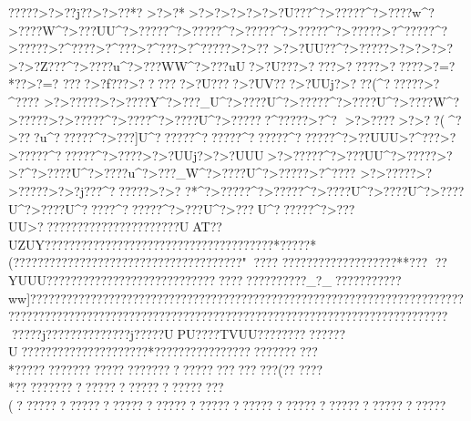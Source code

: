 {{{{{{{{{{{{{{{{{{{{{{{{{{{{{{{{{{{{{{{{{{{{{{{{{{{{{{{{{{{{{{{{{{{{{{{{{{{{{{{{{{{{{{{{{{{{{{{{{{{{{{{{{{{{{{{{{{{{{{{{{{{{{{{{{{{{{{{{{{{{{{{{{{{{{{{{{{{{{{{{{{{{{{{{{{{{{{{{{{{{{{{{{{{{{{{{{{{{{{{{{{{{{{{{{{{{{{{{{{{{{{{{{{{{{{{{{{{{{{{{{{{{{{{{{{{{{{{{{{{{{{{{{{{{{{{{{{{{{{{{{{{{{{{{{{{{{{{{{{{{{{{{{{{{{{{{{{{{{{{{{{{{{{{{{{{{{{{{{{{{{{{{{{{{{{{{{{{{{{{{{{{{{{{{{{{{{{{{{{{{{{{{{{{{{{{{{{{{{{{{{{{{{{{{{{{{{{{{{{{{{{{{{{{{{{{{{{{{{{{{{{{{{{{{{{{{{{{{{{{{{{{{{{{{{{{{{{{{{{{{{{{{{{{{{{{{{{{{{{{{{{{{{{{{{{{{{{{{{{{{{{{{{{{{{{{{{{{{{{{{{{{{{{{{{{{{{{{{{{{{{{{{{{{{{{{{{{{{{{{{{{{{{{{{{{{{{{{{{{{{{{{{{{{{{{{{{{{{{{{{{{{{{{{{{{{{{{{{{{{{{{{{{{{{{{{{{{{{{{{{{{{{{{{{{{{{{{{{{{{{{{{{{{{{{{{{{{{{{{{{{{{{{{{{{{{{{{{{{{{{{{{{{{{{{{{{{{{{{{{{{{{{{{{{{{{{{{{{{{{{{{{{{{{{{{{{{{{{{{{{{{{{{{{{{{{{{{{{{{{{{{{{{{{{{{{{{{{{{{{{{{{{{{{{{{{{{{{{{{{{{{{{{{{{{{{{{{{{{{{{{{{{{{{{{{{{{{{{{{{{{{{{{{{{{{{{{{{{{{{{{{{{{{{{{{{{{{{{{{{{{{{{{{{{{{{{{{{{{{{{{{{{{{{{{{{{{{{{{{{{{{{{{{{{{{{{{{{{{{{{{{{{{{{{{{{{{{{{{{{{{{{{{{{{{{{{{{{{{{{{{{{{{{{{{{{{{{{{{{{{{{{{{{{{{{{{{{{{{{{{{{{{{{{{{{{{{{{{{{{{{{{{{{{{{{{{{{{{{{{{{{{{{{{{{{{{{{{{{{{{{{{{{{{{{{{{{{{{{{{{{{{{{{{{{{{{{{{{{{{{{{{{{{{{{{{{{{{{{{{{{{{{{{{{{{{{{{{{{{{{{{{{{{{{{{{{{{{{{{{{{{{{{{{{{{{{{{{{{{{{{{{{{{{{{{{{{{{{{{{{{{{{{{{{{{{{{{{{{{{{{{{{{{{{{{{{{{{{{{{{{{{{{{{{{{{{{{{{{{{{{{{{{{{{{{{{{{{{{{{{{{{{{{{{{{{{{{{{{{{{{{{{{{{{{{{{{{{{{{{{{{{{{{{{{{{{{{{{{{{{{{{{{{{{{{{{{{{{{{{{{{{{{{{{{{{{{{{{{{{{{{{{{{{{{{{{{{{{{{{{{{{{{{{{{{{{{{{{{{{{{{{{{{{{{{{{{{{{{{{{{{{{{{{{{{{{{{{{{{{{{{{{{{{{{{{{{{{{{{{{{{{{{{{{{{{{{{{{{{{{{{{{{{{{{{{{{{{{{{{{{{{{{{{{{{{{{{{{{{{{{{{{{{{{{{{{{{{{{{{{{{{{{{{{{{{{{{{{{{{{{{{{{{{{{{{{{{{{{{{{{{{{{{{{{{{{{{{{{{{{{{{{{{{{{{{{{{{{{{{{{{{{{{{{{{{{{{{{{{{{{{{{{{{{{{{{{{{{{{{{{{{{{{{{{{{{{{{{{{{{{{{{{{{{{{{{{{{{{{{{{{{{{{{{{{{{{{{{{{{{{{{{{{{{{{{{{{{{{{{{{{{{{{{{{{{{{{{{{{{{{{{{{{{{{{{{{{?????>?>??j??>?>??*?
>?>?*  >?>?    >?>?    >?>?U???^?>?????^?>????w^?>????W^?>???UU^?>?????^?>?????^?>?????^?>?????^?>?????>?^?????^?>?????>?^???? >?^???>?^???>?^?????>?>??   >?>?UU??^?>?????>?>?    >?>?    >?>?Z???^?>????u^?>???WW^?>???uU?>?U???>??  ??>?? ???>?? ???>?=? *??>?=? ????>?f???>??????>?U????>?UV???>?UUj?>??  ?(^??????>?^???? >?>?????>?>????Y^?>???_U^?>????U^?>?????^?>????U^?>????W^?>?????>?>?????^?>????}^?>????U^?>??????^?????>?^?
  >?>????>?>??(^?>???u^??????^?>???]U^??????^??????^??????^??????^?>??UUU>?^???  >?>?????^??????^?>????}>?>?UUj?>?>?UUU>?>?????^?>???UU^?>?????>?>?    ^?>????U^?>????u^?>???_W^?>????U^?>?????>?^????
>?>?????>?>?????>?>?j???^??????>?>?  ?*^?>?????^?>?????^?>????U^?>????U^?>????U^?>????U^?????^??????^?>???}U^?>???U^??????^?>???UU>??   ?????????????????????UAT??UZUY??????????????????????????????????????*?????*(  ?????  ?????? ???????????????????????????"????
???????????????????**???
  ??YUUU????  ???? ??????????????????????????????????_?_???????????ww]?????????? ????????????????????????????????????????????????????????????????????????????????????????????????????????????????????????????????????????????j??????????????j?????UPU????TVUU??????????????U???????????    ???? ?  ?????*??????????????????????????*??????????????????????????????????????? (??????*??????????????????????????????   (????????????????????????????????????????????????????????????}}}}}}}}}}}}}}}}}}}}}}}}}}}}}}}}}}}}}}}}}}}}}}}}}}}}}}}}}}}}}}}}}}}}}}}}}}}}}}}}}}}}}}}}}}}}}}}}}}}}}}}}}}}}}}}}}}}}}}}}}}}}}}}}}}}}}}}}}}}}}}}}}}}}}}}}}}}}}}}}}}}}}}}}}}}}}}}}}}}}}}}}}}}}}}}}}}}}}}}}}}}}}}}}}}}}}}}}}}}}}}}}}}}}}}}}}}}}}}}}}}}}}}}}}}}}}}}}}}}}}}}}}}}}}}}}}}}}}}}}}}}}}}}}}}}}}}}}}}}}}}}}}}}}}}}}}}}}}}}}}}}}}}}}}}}}}}}}}}}}}}}}}}}}}}}}}}}}}}}}}}}}}}}}}}}}}}}}}}}}}}}}}}}}}}}}}}}}}}}}}}}}}}}}}}}}}}}}}}}}}}}}}}}}}}}}}}}}}}}}}}}}}}}}}}}}}}}}}}}}}}}}}}}}}}}}}}}}}}}}}}}}}}}}}}}}}}}}}}}}}}}}}}}}}}}}}}}}}}}}}}}}}}}}}}}}}}}}}}}}}}}}}}}}}}}}}}}}}}}}}}}}}}}}}}}}}}}}}}}}}}}}}}}}}}}}}}}}}}}}}}}}}}}}}}}}}}}}}}}}}}}}}}}}}}}}}}}}}}}}}}}}}}}}}}}}}}}}}}}}}}}}}}}}}}}}}}}}}}}}}}}}}}}}}}}}}}}}}}}}}}}}}}}}}}}}}}}}}}}}}}}}}}}}}}}}}}}}}}}}}}}}}}}}}}}}}}}}}}}}}}}}}}}}}}}}}}}}}}}}}}}}}}}}}}}}}}}}}}}}}}}}}}}}}}}}}}}}}}}}}}}}}}}}}}}}}}}}}}}}}}}}}}}}}}}}}}}}}}}}}}}}}}}}}}}}}}}}}}}}}}}}}}}}}}}}}}}}}}}}}}}}}}}}}}}}}}}}}}}}}}}}}}}}}}}}}}}}}}}}}}}}}}}}}}}}}}}}}}}}}}}}}}}}}}}}}}}}}}}}}}}}}}}}}}}}}}}}}}}}}}}}}}}}}}}}}}}}}}}}}}}}}}}}}}}}}}}}}}}}}}}}}}}}}}}}}}}}}}}}}}}}}}}}}}}}}}}}}}}}}}}}}}}}}}}}}}}}}}}}}}}}}}}}}}}}}}}}}}}}}}}}}}}}}}}}}}}}}}}}}}}}}}}}}}}}}}}}}}}}}}}}}}}}}}}}}}}}}}}}}}}}}}}}}}}}}}}}}}}}}}}}}}}}}}}}}}}}}}}}}}}}}}}}}}}}}}}}}}}}}}}}}}}}}}}}}}}}}}}}}}}}}}}}}}}}}}}}}}}}}}}}}}}}}}}}}}}}}}}}}}}}}}}}}}}}}}}}}}}}}}}}}}}}}}}}}}}}}}}}}}}}}}}}}}}}}}}}}}}}}}}}}}}}}}}}}}}}}}}}}}}}}}}}}}}}}}}}}}}}}}}}}}}}}}}}}}}}}}}}}}}}}}}}}}}}}}}}}}}}}}}}}}}}}}}}}}}}}}}}}}}}}}}}}}}}}}}}}}}}}}}}}}}}}}}}}}}}}}}}}}}}}}}}}}}}}}}}}}}}}}}}}}}}}}}}}}}}}}}}}}}}}}}}}}}}}}}}}}}}}}}}}}}}}}}}}}}}}}}}}}}}}}}}}}}}}}}}}}}}}}}}}}}}}}}}}}}}}}}}}}}}}}}}}}}}}}}}}}}}}}}}}}}}}}}}}}}}}}}}}}}}}}}}}}}}}}}}}}}}}}}}}}}}}}}}}}}}}}}}}}}}}}}}}}}}}}}}}}}}}}}}}}}}}}}}}}}}}}}}}}}}}}}}}}}}}}}}}}}}}}}}}}}}}}}}}}}}}}}}}}}}}}}}}}}}}}}}}}}}}}}}}}}}}}}}}}}}}}}}}}}}}}}}}}}}}}}}}}}}}}}}}}}}}}}
